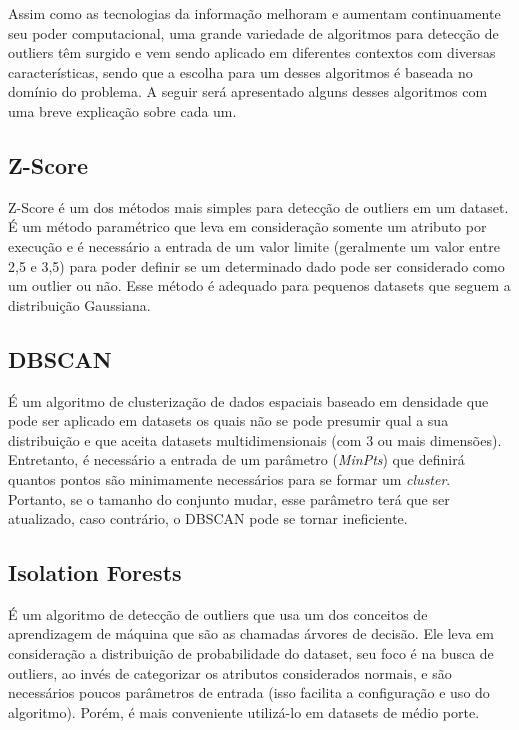 Assim como as tecnologias da informação melhoram e aumentam continuamente seu poder computacional, uma grande variedade de algoritmos para detecção de outliers têm surgido e vem sendo aplicado em diferentes contextos com diversas características, sendo que a escolha para um desses algoritmos é baseada no domínio do problema. A seguir será apresentado alguns desses algoritmos com uma breve explicação sobre cada um.

\subsection{Z-Score}

Z-Score \cite{doi:10.1111/j.1540-6261.1968.tb00843.x} é um dos métodos mais simples para detecção de outliers em um dataset. É um método paramétrico que leva em consideração somente um atributo por execução e é necessário a entrada de um valor limite (geralmente um valor entre 2,5 e 3,5) para poder definir se um determinado dado pode ser considerado como um outlier ou não. Esse método é adequado para pequenos datasets que seguem a distribuição Gaussiana.

\subsection{DBSCAN}

É um algoritmo de clusterização de dados espaciais baseado em densidade \cite{Ester:1996:DAD:3001460.3001507} que pode ser aplicado em datasets os quais não se pode presumir qual a sua distribuição e que aceita datasets multidimensionais (com 3 ou mais dimensões). Entretanto, é necessário a entrada de um parâmetro (\textit{MinPts}) que definirá quantos pontos são minimamente necessários para se formar um \textit{cluster}. Portanto, se o tamanho do conjunto mudar, esse parâmetro terá que ser atualizado, caso contrário, o DBSCAN pode se tornar ineficiente.

\subsection{Isolation Forests}

É um algoritmo de detecção de outliers \cite{IsolationForests} que usa um dos conceitos de aprendizagem de máquina que são as chamadas árvores de decisão. Ele leva em consideração a distribuição de probabilidade do dataset, seu foco é na busca de outliers, ao invés de categorizar os atributos considerados normais, e são necessários poucos parâmetros de entrada (isso facilita a configuração e uso do algoritmo). Porém, é mais conveniente utilizá-lo em datasets de médio porte.

